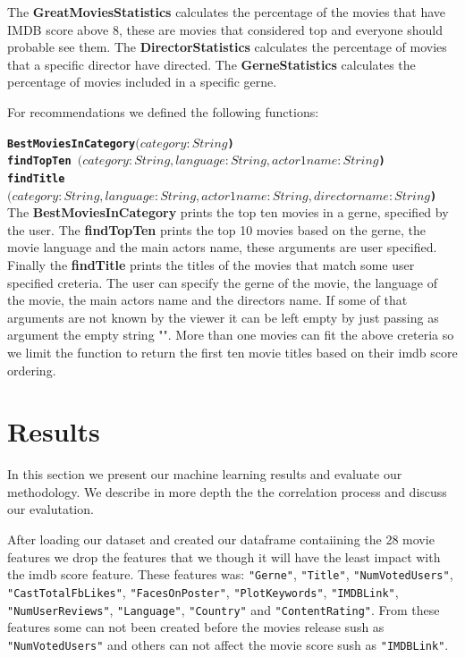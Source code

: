 \documentclass[letterpaper,twocolumn,10pt]{article}
\begin{document}
The \textbf{GreatMoviesStatistics} calculates the percentage of the movies that have IMDB score above 8, these are movies that considered top and everyone should probable see them. The \textbf{DirectorStatistics} calculates the percentage of movies that a specific director have directed. The \textbf{GerneStatistics} calculates the percentage of movies included in a specific gerne. \par


For recommendations we defined the following functions:

\noindent
{\bf \tt BestMoviesInCategory\((category:String\)) } \\

\noindent
{\bf \tt findTopTen  \((category:String,language:String,actor1name:String\)) } \\

\noindent
{\bf \tt findTitle\((category:String, language:String, actor1name:String, directorname:String\)) } \\

The \textbf{BestMoviesInCategory} prints the top ten movies in a gerne, specified by the user. The \textbf{findTopTen} prints the top 10 movies based on the gerne, the movie language and the main actors name, these arguments are user specified. Finally the \textbf{findTitle} prints the titles of the movies that match some user specified creteria. The user can specify the gerne of the movie, the language of the movie, the main actors name and the directors name. If some of that arguments are not known  by the viewer it can be left empty by just passing as argument the empty string "". More than one movies can fit the above creteria so we limit the function to return the first ten movie titles based on their imdb score ordering. \par

\section{Results}
In this section we present our machine learning results and evaluate our methodology. We describe in more depth the the correlation process and discuss our evalutation.\par
After loading our dataset and created our dataframe contaiining the 28 movie features we drop the features that we though it will have the least impact with the imdb score feature. These features was: \texttt{"Gerne"}, \texttt{"Title"}, \texttt{"NumVotedUsers"}, \texttt{"CastTotalFbLikes"}, \texttt{"FacesOnPoster"}, \texttt{"PlotKeywords"}, \texttt{"IMDBLink"}, \texttt{"NumUserReviews"}, \texttt{"Language"}, \texttt{"Country"} and \texttt{"ContentRating"}. From these features some can not been created before the movies release sush as \texttt{"NumVotedUsers"} and others can not affect the movie score sush as \texttt{"IMDBLink"}.\par 
\end{document}
